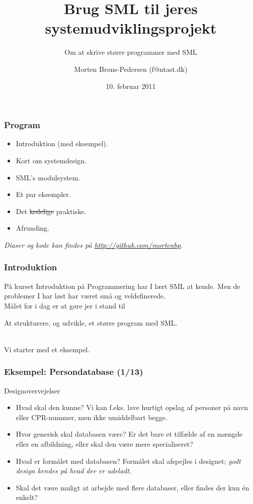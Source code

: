 \documentclass[slidestop,compress,mathserif, xcolor=table]{beamer}
\title[]{Brug SML til jeres systemudviklingsprojekt}
\subtitle{Om at skrive større programmer med SML}
\author[Morten Brøns-Pedersen]
       {Morten Brøns-Pedersen {\tiny(f$@$ntast.dk)}}
\institute[DIKU]{Datalogisk institut}
\date[]{10. februar 2011}
\begin{document}
\frame[plain]{\titlepage}

\begin{frame}
  \frametitle{Program}

  \begin{itemize}
  \item Introduktion (med eksempel).
  \item Kort om systemdesign.
  \item SML's modulsystem.
  \item Et par eksempler.
  \item Det \sout{kedelige} praktiske.
  \item Afrunding.
  \end{itemize}\vfill

  \textit{Diaser og kode kan findes på \url{http://github.com/mortenbp}.}
\end{frame}

\begin{frame}
  \frametitle{Introduktion}

  På kurset Introduktion på Programmering har I lært SML at kende. Men de
  problemer I har løst har været små og veldefinerede.\\[1em]

  Målet for i dag er at gøre jer i stand til
  \begin{block}{}
    \center At strukturere, og udvikle, et større program med SML.
  \end{block}\ \\

  Vi starter med et eksempel.
\end{frame}

\begin{frame}
  \frametitle{Eksempel: Persondatabase \quad (1/13)}

  Designovervejelser
  \begin{itemize}
  \item Hvad skal den kunne? Vi kan f.eks. lave hurtigt opslag af personer på
    navn eller CPR-nummer, men ikke umiddelbart begge.
  \item Hvor generisk skal databasen være? Er det bare et tilfælde af en mængde
    eller en afbildning, eller skal den være mere specialiseret?
  \item Hvad er formålet med databasen? Formålet skal afspejles i designet; \textit{godt
      design kendes på hvad der er udeladt.}
  \item Skal det være muligt at arbejde med flere databaser, eller findes der
    kun én enkelt?
  \end{itemize}
\end{frame}
\end{document}
